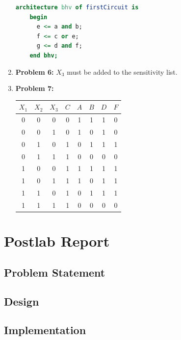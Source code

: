 \documentclass{article}
\begin{document}
\begin{figure}[h]
\begin{enumerate}
\begin{lstlisting}[language=VHDL]
    architecture bhv of firstCircuit is
    begin
      e <= a and b;
      f <= c or e;
      g <= d and f;
    end bhv;
  \end{lstlisting}
  \item \textbf{Problem 6:} $X_3$ must be added to the sensitivity list.
  \item \textbf{Problem 7:} \\
  \begin{tabular}{|c|c|c|c|c|c|c|c|}
    \hline
    $X_1$ & $X_2$ & $X_3$ & $C$ & $A$ & $B$ & $D$ & $F$ \\
    \hline
    0 & 0 & 0 & 0 & 1 & 1 & 1 & 0 \\
    \hline
    0 & 0 & 1 & 0 & 1 & 0 & 1 & 0 \\
    \hline
    0 & 1 & 0 & 1 & 0 & 1 & 1 & 1 \\
    \hline
    0 & 1 & 1 & 1 & 0 & 0 & 0 & 0 \\
    \hline
    1 & 0 & 0 & 1 & 1 & 1 & 1 & 1 \\
    \hline
    1 & 0 & 1 & 1 & 1 & 0 & 1 & 1 \\
    \hline 
    1 & 1 & 0 & 1 & 0 & 1 & 1 & 1 \\
    \hline
    1 & 1 & 1 & 1 & 0 & 0 & 0 & 0 \\
    \hline
  \end{tabular}
\end{enumerate}

\section*{Postlab Report}

\subsection*{Problem Statement}

\subsection*{Design}

\subsection*{Implementation}


\end{figure}
\end{document}
